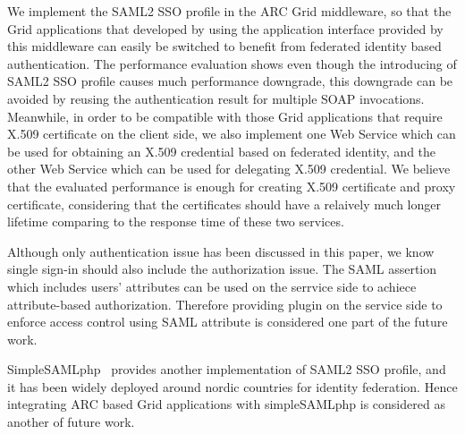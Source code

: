 \documentclass[conference]{IEEEtran}
\begin{document}
We implement the SAML2 SSO profile in the ARC Grid middleware, so that the Grid applications
that developed by using the application interface provided by this middleware can easily 
be switched to benefit from federated identity based authentication. 
The performance evaluation shows even though the introducing of SAML2 SSO profile causes 
much performance downgrade, this downgrade can be avoided by reusing the authentication 
result for multiple SOAP invocations.
Meanwhile, in order to be compatible with those Grid applications that require X.509 
certificate on the client side, we also implement one Web Service which can be used for 
obtaining an X.509 credential based on federated identity, and the other Web Service 
which can be used for delegating X.509 credential. We believe that the evaluated 
performance is enough for creating X.509 certificate and proxy certificate, considering that 
the certificates should have a relaively much longer lifetime comparing to the response time of 
these two services.
 
Although only authentication issue has been discussed in this paper, we know single
sign-in should also include the authorization issue. The SAML assertion which includes
users' attributes can be used on the serrvice side to achiece attribute-based authorization.
Therefore providing plugin on the service side to enforce access control using SAML attribute
is considered one part of the future work.

SimpleSAMLphp~\cite{simplesamllink} provides another implementation of SAML2 SSO profile, and it 
has been widely deployed around nordic countries for identity federation. Hence integrating
ARC based Grid applications with simpleSAMLphp is considered as another of future work.



%
%
\end{document}
